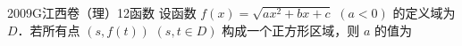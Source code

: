 
\begin{problem}{2009}{G}{江西卷（理）}{12}{函数}
设函数 $f(x)=\sqrt{ax^2+bx+c}$ $(a<0)$ 的定义域为 $D$．若所有点 $(s,f(t))$ $(s,t\in D)$ 构成一个正方形区域，则 $a$ 的值为

\begin{choices}
\end{choices}
\end{problem}